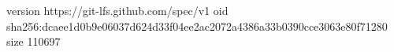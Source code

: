version https://git-lfs.github.com/spec/v1
oid sha256:dcaee1d0b9e06037d624d33f04ee2ac2072a4386a33b0390cce3063e80f71280
size 110697

